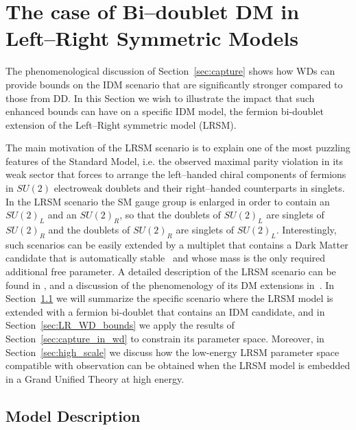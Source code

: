 \documentclass[11pt]{article}
\begin{document}
\section{The case of Bi--doublet DM in Left--Right Symmetric Models}
\label{sec:LR}
The phenomenological discussion of Section~\ref{sec:capture} shows how WDs can provide bounds on the IDM scenario that are significantly stronger compared
to those from DD. In this Section we wish to illustrate the impact that such enhanced bounds can have on a specific IDM model, the fermion bi-doublet extension of the Left--Right symmetric model (LRSM). 

The main motivation of the LRSM scenario is to explain one of the most puzzling features of the Standard Model, i.e. the observed maximal parity violation in its weak sector that forces to arrange the left--handed chiral components of fermions in $SU(2)$ electroweak doublets and their right--handed counterparts in singlets. In the LRSM scenario the SM gauge group is enlarged in order to contain an $SU(2)_L$ and an $SU(2)_R$, so that the doublets of $SU(2)_L$ are singlets of $SU(2)_R$ and the doublets of $SU(2)_R$ are singlets of $SU(2)_L$.        
Interestingly, such scenarios can be easily extended by a multiplet that contains a Dark Matter candidate that is automatically stable~\cite{Cirelli:2005uq, Heeck_2015_LRSM_DM_stability} and whose mass is the only required additional free parameter. A detailed description of the LRSM scenario can be found in \cite{Duka:1999uc}, and a discussion of the phenomenology of its DM extensions in~\cite{Garcia-Cely_LR_pheno}. In Section~\ref{sec:model_description} we will summarize the specific scenario where the LRSM model is extended with a fermion bi-doublet that contains an IDM candidate, and in Section~\ref{sec:LR_WD_bounds} we apply the results of  Section~\ref{sec:capture_in_wd} to constrain its parameter space. Moreover, in Section~\ref{sec:high_scale}  we discuss how the low-energy LRSM parameter space compatible with observation can be obtained when the LRSM model is embedded in a Grand Unified Theory at high energy.

\subsection{Model Description}
\label{sec:model_description}
\end{document}
